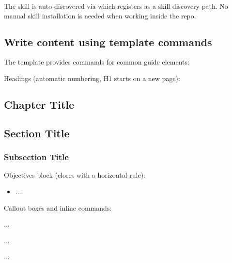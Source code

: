 \documentclass{guide}
\begin{document}
\begin{infobox}
The skill is auto-discovered via  which registers
 as a skill discovery path. No manual skill installation
is needed when working inside the repo.
\end{infobox}

\subsection{Write content using template commands}

The template provides commands for common guide elements:

Headings (automatic numbering, H1 starts on a new page):

\begin{code}
\section{Chapter Title}          %
\subsection{Section Title}        %
\subsubsection{Subsection Title}  %
\end{code}

Objectives block (closes with a horizontal rule):

\begin{code}
\begin{objectives}
  \prerequisites
  \begin{itemize}
    \item ...
  \end{itemize}
\end{objectives}
\end{code}

Callout boxes and inline commands:

\begin{code}
\begin{warning} ... \end{warning}     %
\begin{tip}  ... \end{tip}      %
\begin{infobox} ... \end{infobox} %
\end{code}
\end{document}
